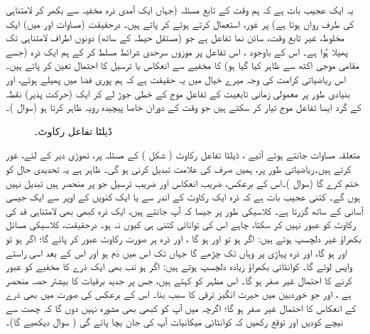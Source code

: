  یہ ایک عجیب بات ہے کہ ہم                                                                           وقت کے تابع مسئلہ (جہاں ایک آمدی ذرہ مخفیہ سے بکھر کر لامتناہی کی طرف رواں ہوتا ہے) پر غور،  استعمال کرتے ہوئے کر پاتے ہیں۔ درحقیقت (مساوات  اور  میں)  ایک مخلوط، غیر تابع وقت، سائن نما تفاعل ہے جو (مستقل حیطہ کے ساتھ)  دونوں اطراف لامتناہی تک پھیلا ہُوا ہے۔ اس کے باوجود ، اس تفاعل پر موزوں سرحدی شرائط مسلط کر کے ہم ایک ذرہ (جسے مقامی موجی اکٹھ سے ظاہر کیا گیا ہو) کا  مخفیے سے انعکاس یا ترسیل کا احتمال تعین کر پاتے ہیں۔ اس ریاضیاتی کرامت کی وجہ میرے خیال میں یہ حقیقت ہے کہ ہم پوری فضا میں پھیلے ہوئے، اور بنیادی طور پر معمولی زمانی تابعیت کے تفاعل موج کے خطی جوڑ لے کر ایک (حرکت پذیر)  نقطہ کے گرد ایسا تفاعل موج تیار کر سکتے ہیں  جو   وقت کے دوران خاصا پیچیدہ رویہ ظاہر کرتا ہو (سوال )۔ 
 
 \begin{figure}
\centering
{}
\caption{ڈیلٹا تفاعل رکاوٹ۔}
\label{شکل_غیر_تابع_ڈیلٹا_تفاعل_رکاوٹ}
\end{figure}

متعلقہ مساوات جانتے ہوئے آئیے ، ڈیلٹا تفاعل رکاوٹ ( شکل ) کے مسئلہ پر، تھوڑی دیر کے لئے،  غور کرتے ہیں۔ریاضیاتی  طور پر،  ہمیں صرف  کی علامت تبدیل کرنی ہو گی۔ ظاہر ہے یہ تحدیدی حال کو ختم کرے گا (سوال )۔اس کے برعکس، ضریب انعکاس اور ضریب ترسیل جو  پر منحصر ہیں  تبدیل نہیں ہوں گے۔ کتنی عجیب بات ہے کہ ذرہ ایک رکاوٹ کے اندر سے یا ایک کنویں کے اوپر سے ایک جیسی  آسانی کے ساتھ گزرتا ہے۔ کلاسیکی طور پر جیسا کہ آپ جانتے ہیں، ایک ذرہ کبھی بھی لامتناہی قد کی  رکاوٹ کو عبور نہیں کر سکتا، چاہے اس کی توانائی کتنی ہی کیوں نہ ہو۔ درحقیقت،  کلاسیکی مسائل بکھراؤ غیر دلچسپ ہوتے ہیں: اگر  ہو تو   اور  ہو گا ، اور ذرہ ہر صورت رکاوٹ عبور کر پائے گا؛ اگر  ہو تو  اور  ہو گا،  اور ذرہ پہاڑی پر وہاں تک چڑھے گا جہاں تک اس میں دَم ہو اور اس کے بعد اسی راستے واپس لوٹے گا۔ کوانٹائی بکھراؤ زیادہ دلچسپ ہوتے ہیں: اگر  ہو تب  بھی ایک ذرے کا مخفیے کو  عبور کرنے کا احتمال غیر صفر ہو گا۔ اس مظہر کو  کہتے ہیں،  جس پر جدید برقیات کا بیشتر حصہ منحصر ہے ، اور جو خوردبین میں حیرت انگیز ترقی کا سبب بنا۔ اس کے برعکس  کی صورت میں بھی ذرے کے انعکاس کا احتمال غیر صفر ہو گا؛ اگرچہ میں آپ کو کبھی بھی مشورہ نہیں دوں گا کہ چھت سے نیچے کودیں اور توقع رکھیں کہ کوانٹائی میکانیات آپ کی جان بچا پائے گی ( سوال  دیکھیے گا)۔
 

